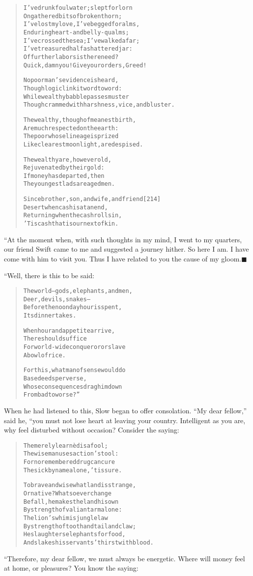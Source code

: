 \documentclass[article, twoside, 14pt]{memoir}
\newcommand{\qed}{\hfill \ensuremath{\blacksquare}}
\renewenvironment{verbatim}{%
\begin{quote}%
\vskip -10pt%
\begin{alltt}\normalfont\large}{\end{alltt}%
\end{quote}%
\vskip -10pt
} %
\begin{document}
\begin{verbatim}
I've drunk foul water; slept forlorn
On gathered bits of broken thorn;
I've lost my love, I've begged for alms,
Enduring heart- and belly-qualms;
I've crossed the sea; I've walked afar;
I've treasured half a shattered jar:
Of further labors is there need?
Quick, damn you! Give your orders, Greed!

No poor man's evidence is heard,
Though logic link it word to word:
While wealthy babble passes muster
Though crammed with harshness, vice, and bluster.

The wealthy, though of meanest birth,
Are much respected on the earth:
The poor whose lineage is prized
Like clearest moonlight, are despised.

The wealthy are, however old,
Rejuvenated by their gold:
If money has departed, then
The youngest lads are aged men.

Since brother, son, and wife, and friend                [214]
Desert when cash is at an end,
Returning when the cash rolls in,
'Tis cash that is our next of kin.
\end{verbatim}
“At the moment when, with such thoughts in my mind, I went to my
quarters, our friend Swift came to me and suggested a journey
hither. So here I am. I have come with him to visit you. Thus I
have related to you the cause of my gloom.\hyperref[s38]{\qed}

“Well, there is this to be said:

\begin{verbatim}
The world--gods, elephants, and men,
    Deer, devils, snakes--
Before the noonday hour is spent,
    Its dinner takes.

When hour and appetite arrive,
    There should suffice
For world-wide conqueror or slave
    A bowl of rice.

For this, what man of sense would do
    Base deeds perverse,
Whose consequences drag him down
    From bad to worse?”
\end{verbatim}
When he had listened to this, Slow began to offer consolation.
``My dear fellow,'' said he, “you must not lose heart at leaving
your country. Intelligent as you are, why feel disturbed without
occasion? Consider the saying:

\begin{verbatim}
The merely learnèd is a fool;
The wise man uses action's tool:
For no remembered drug can cure
The sick by name alone, 'tis sure.

To brave and wise what land is strange,
Or native? Whatsoever change
Befall, he makes the land his own
By strength of valiant arm alone:
The lion's whim is jungle law
By strength of tooth and tail and claw;
He slaughters elephants for food,
And slakes his servants' thirst with blood.
\end{verbatim}
“Therefore, my dear fellow, we must always be energetic. Where will
money feel at home, or pleasures? You know the saying:
\end{document}
